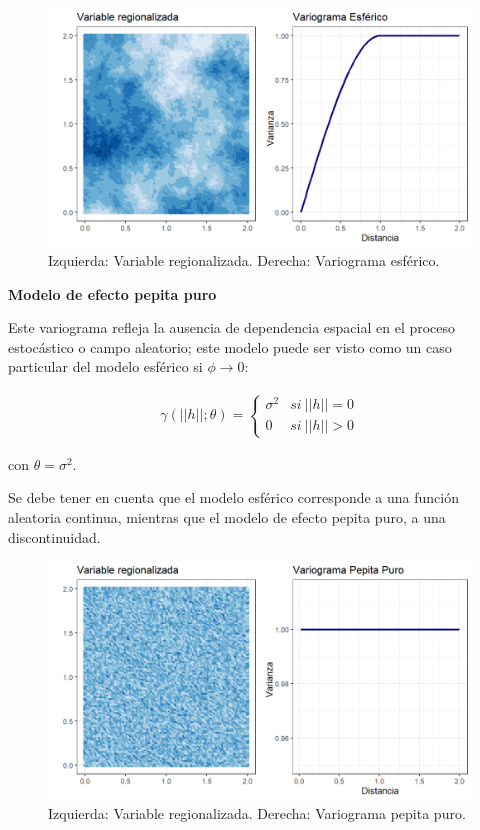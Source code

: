 \documentclass[
]{book}
\begin{document}
\begin{figure}
\includegraphics[width=17.78in]{figuras/otros/sph_var} \caption{Izquierda: Variable regionalizada. Derecha: Variograma esférico.}\label{fig:sphvar}
\end{figure}

\textbf{Modelo de efecto pepita puro}

Este variograma refleja la ausencia de dependencia espacial en el proceso estocástico o campo aleatorio; este modelo puede ser visto como un caso particular del modelo esférico si \(\phi \to 0\):

\begin{align*}        
    \gamma(||h||;\theta) = \left \{ \begin{matrix} \sigma^2&  si \ ||h|| =0\\
    0 &  si\ ||h||>0 \end{matrix}\right.
    \end{align*}

con \(\theta=\sigma^2\).

Se debe tener en cuenta que el modelo esférico corresponde a una función aleatoria continua, mientras que el modelo de efecto pepita puro, a una discontinuidad.

\begin{figure}
\includegraphics[width=17.78in]{figuras/otros/pepita_var} \caption{Izquierda: Variable regionalizada. Derecha: Variograma pepita puro.}\label{fig:unnamed-chunk-2}
\end{figure}
\end{document}
